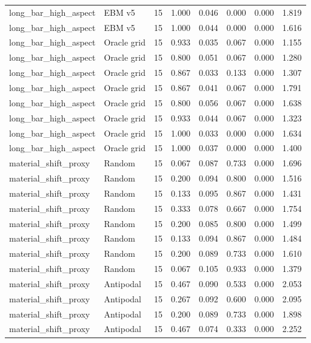 {\begin{longtable}{llrrrrrr}
long\_bar\_high\_aspect & EBM v5 & 15 & 1.000 & 0.046 & 0.000 & 0.000 & 1.819 \\
long\_bar\_high\_aspect & EBM v5 & 15 & 1.000 & 0.044 & 0.000 & 0.000 & 1.616 \\
long\_bar\_high\_aspect & Oracle grid & 15 & 0.933 & 0.035 & 0.067 & 0.000 & 1.155 \\
long\_bar\_high\_aspect & Oracle grid & 15 & 0.800 & 0.051 & 0.067 & 0.000 & 1.280 \\
long\_bar\_high\_aspect & Oracle grid & 15 & 0.867 & 0.033 & 0.133 & 0.000 & 1.307 \\
long\_bar\_high\_aspect & Oracle grid & 15 & 0.867 & 0.041 & 0.067 & 0.000 & 1.791 \\
long\_bar\_high\_aspect & Oracle grid & 15 & 0.800 & 0.056 & 0.067 & 0.000 & 1.638 \\
long\_bar\_high\_aspect & Oracle grid & 15 & 0.933 & 0.044 & 0.067 & 0.000 & 1.323 \\
long\_bar\_high\_aspect & Oracle grid & 15 & 1.000 & 0.033 & 0.000 & 0.000 & 1.634 \\
long\_bar\_high\_aspect & Oracle grid & 15 & 1.000 & 0.037 & 0.000 & 0.000 & 1.400 \\
material\_shift\_proxy & Random & 15 & 0.067 & 0.087 & 0.733 & 0.000 & 1.696 \\
material\_shift\_proxy & Random & 15 & 0.200 & 0.094 & 0.800 & 0.000 & 1.516 \\
material\_shift\_proxy & Random & 15 & 0.133 & 0.095 & 0.867 & 0.000 & 1.431 \\
material\_shift\_proxy & Random & 15 & 0.333 & 0.078 & 0.667 & 0.000 & 1.754 \\
material\_shift\_proxy & Random & 15 & 0.200 & 0.085 & 0.800 & 0.000 & 1.499 \\
material\_shift\_proxy & Random & 15 & 0.133 & 0.094 & 0.867 & 0.000 & 1.484 \\
material\_shift\_proxy & Random & 15 & 0.200 & 0.089 & 0.733 & 0.000 & 1.610 \\
material\_shift\_proxy & Random & 15 & 0.067 & 0.105 & 0.933 & 0.000 & 1.379 \\
material\_shift\_proxy & Antipodal & 15 & 0.467 & 0.090 & 0.533 & 0.000 & 2.053 \\
material\_shift\_proxy & Antipodal & 15 & 0.267 & 0.092 & 0.600 & 0.000 & 2.095 \\
material\_shift\_proxy & Antipodal & 15 & 0.200 & 0.089 & 0.733 & 0.000 & 1.898 \\
material\_shift\_proxy & Antipodal & 15 & 0.467 & 0.074 & 0.333 & 0.000 & 2.252 \\

\end{longtable}}
